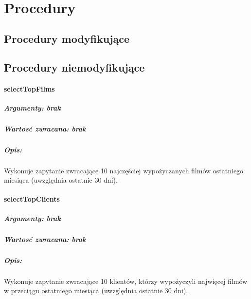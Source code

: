 \documentclass[12pt,a4paper,titlepage]{article}
\begin{document}
\section{Procedury}
\subsection{Procedury modyfikujące}
\subsection{Procedury niemodyfikujące}

\paragraph{selectTopFilms}
\subparagraph{Argumenty: brak}
\subparagraph{Wartosć zwracana: brak}
\subparagraph{Opis:}
Wykonuje zapytanie zwracające 10 najczęściej wypożyczanych filmów ostatniego miesiąca (uwzględnia ostatnie 30 dni).

\paragraph{selectTopClients}
\subparagraph{Argumenty: brak}
\subparagraph{Wartosć zwracana: brak}
\subparagraph{Opis:}
Wykonuje zapytanie zwracające 10 klientów, którzy wypożyczyli najwięcej filmów w przeciągu ostatniego miesiąca (uwzględnia ostatnie 30 dni).
\end{document}
